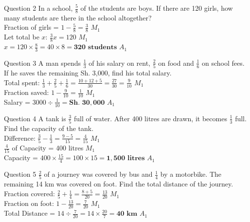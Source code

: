 \documentclass[12pt, a4paper, oneside]{article}
\begin{document}
\begin{solvingbox}{Question 2}
In a school, $\frac{5}{8}$ of the students are boys. If there are 120 girls, how many students are there in the school altogether? \\
Fraction of girls = $1 - \frac{5}{8} = \frac{3}{8}$ \hfill $M_1$ \\
Let total be $x$: $\frac{3}{8}x = 120$ \hfill $M_1$ \\
$x = 120 \times \frac{8}{3} = 40 \times 8 = \mathbf{320\text{ students}}$ \hfill $A_1$
\end{solvingbox}

\begin{solvingbox}{Question 3}
A man spends $\frac{1}{3}$ of his salary on rent, $\frac{2}{5}$ on food and $\frac{1}{6}$ on school fees. If he saves the remaining Sh. 3,000, find his total salary. \\
Total spent: $\frac{1}{3} + \frac{2}{5} + \frac{1}{6} = \frac{10 + 12 + 5}{30} = \frac{27}{30} = \frac{9}{10}$ \hfill $M_1$ \\
Fraction saved: $1 - \frac{9}{10} = \frac{1}{10}$ \hfill $M_1$ \\
Salary = $3000 \div \frac{1}{10} = \mathbf{\text{Sh. } 30,000}$ \hfill $A_1$
\end{solvingbox}

\begin{solvingbox}{Question 4}
A tank is $\frac{3}{5}$ full of water. After 400 litres are drawn, it becomes $\frac{1}{3}$ full. Find the capacity of the tank. \\
Difference: $\frac{3}{5} - \frac{1}{3} = \frac{9 - 5}{15} = \frac{4}{15}$ \hfill $M_1$ \\
$\frac{4}{15}$ of Capacity = 400 litres \hfill $M_1$ \\
Capacity = $400 \times \frac{15}{4} = 100 \times 15 = \mathbf{1,500\text{ litres}}$ \hfill $A_1$
\end{solvingbox}

\begin{solvingbox}{Question 5}
$\frac{2}{5}$ of a journey was covered by bus and $\frac{1}{4}$ by a motorbike. The remaining 14 km was covered on foot. Find the total distance of the journey. \\
Fraction covered: $\frac{2}{5} + \frac{1}{4} = \frac{8 + 5}{20} = \frac{13}{20}$ \hfill $M_1$ \\
Fraction on foot: $1 - \frac{13}{20} = \frac{7}{20}$ \hfill $M_1$ \\
Total Distance = $14 \div \frac{7}{20} = 14 \times \frac{20}{7} = \mathbf{40\text{ km}}$ \hfill $A_1$
\end{solvingbox}
\end{document}
